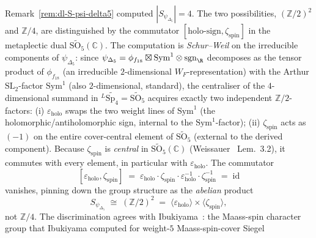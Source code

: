 \begin{remark}[Group-structure determination: $S_{\psi_{\Delta_5}} = (\mathbb{Z}/2)^2$ versus $\mathbb{Z}/4$]
\label{rem:dl-kazhdan-group-structure}
Remark~\ref{rem:dl-S-psi-delta5} computed
$|S_{\psi_{\Delta_5}}| = 4$. The two possibilities,
$(\mathbb{Z}/2)^2$ and $\mathbb{Z}/4$, are distinguished by the
commutator $[\text{holo-sign}, \zeta_{\mathrm{spin}}]$ in the
metaplectic dual $\widetilde{\mathrm{SO}_5}(\mathbb{C})$.
The computation is \emph{Schur--Weil} on the irreducible components of
$\psi_{\Delta_5}$: since
$\psi_{\Delta_5} = \phi_{f_{18}}\boxtimes\mathrm{Sym}^1\otimes
\mathrm{sgn}_\R$ decomposes as the tensor product of
$\phi_{f_{18}}$ (an irreducible $2$-dimensional $W_F$-representation)
with the Arthur $\mathrm{SL}_2$-factor $\mathrm{Sym}^1$ (also $2$-dimensional,
standard), the centraliser of the $4$-dimensional summand in
${}^L\widetilde{\mathrm{Sp}_4} = \widetilde{\mathrm{SO}_5}$ acquires
exactly two independent $\mathbb{Z}/2$-factors:
(i) $\varepsilon_{\mathrm{holo}}$ swaps the two weight lines of
$\mathrm{Sym}^1$ (the holomorphic/antiholomorphic sign, internal to the
$\mathrm{Sym}^1$-factor); (ii) $\zeta_{\mathrm{spin}}$ acts as $(-1)$ on
the entire cover-central element of $\widetilde{\mathrm{SO}_5}$
(external to the derived component). Because $\zeta_{\mathrm{spin}}$ is
\emph{central} in $\widetilde{\mathrm{SO}_5}(\mathbb{C})$
(Weissauer~\cite{Weissauer2009GSp4} Lem.\ 3.2), it commutes with every
element, in particular with $\varepsilon_{\mathrm{holo}}$. The commutator
\begin{equation}
\label{eq:kazhdan-commutator-trivial}
 [\varepsilon_{\mathrm{holo}}, \zeta_{\mathrm{spin}}]
 \;=\;
 \varepsilon_{\mathrm{holo}}\cdot\zeta_{\mathrm{spin}}\cdot
 \varepsilon_{\mathrm{holo}}^{-1}\cdot\zeta_{\mathrm{spin}}^{-1}
 \;=\;
 \mathrm{id}
\end{equation}
vanishes, pinning down the group structure as the \emph{abelian}
product
\begin{equation}
\label{eq:kazhdan-group-ZZ2x2}
 S_{\psi_{\Delta_5}}
 \;\cong\;
 (\mathbb{Z}/2)^2
 \;=\;
 \langle \varepsilon_{\mathrm{holo}}\rangle
 \times
 \langle \zeta_{\mathrm{spin}}\rangle,
\end{equation}
not $\mathbb{Z}/4$. The discrimination agrees with
Ibukiyama~\cite{Ibukiyama1998Paramodular}: the Maass-spin character
group that Ibukiyama computed for weight-$5$ Maass-spin-cover Siegel

\end{remark}
